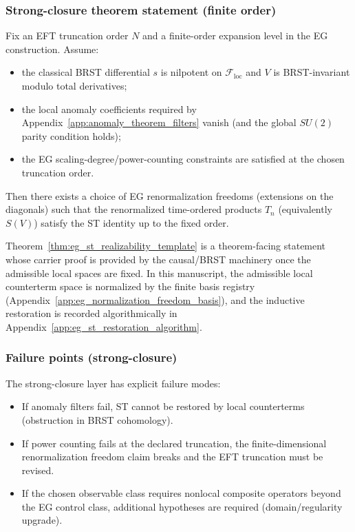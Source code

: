 \subsubsection{Strong-closure theorem statement (finite order)}
\begin{theorem}
\label{thm:eg_st_realizability_template}
Fix an EFT truncation order $N$ and a finite-order expansion level in the EG construction.
Assume:
\begin{itemize}
\item the classical BRST differential $s$ is nilpotent on $\mathcal{F}_{\mathrm{loc}}$ and $V$ is BRST-invariant modulo total derivatives;
\item the local anomaly coefficients required by Appendix~\ref{app:anomaly_theorem_filters} vanish (and the global $SU(2)$ parity condition holds);
\item the EG scaling-degree/power-counting constraints are satisfied at the chosen truncation order.
\end{itemize}
Then there exists a choice of EG renormalization freedoms (extensions on the diagonals) such that the renormalized time-ordered products $T_n$ (equivalently $S(V)$) satisfy the ST identity up to the fixed order.
\end{theorem}

\AuditTag Theorem~\ref{thm:eg_st_realizability_template} is a theorem-facing statement whose carrier proof is provided by the causal/BRST machinery once the admissible local spaces are fixed.
In this manuscript, the admissible local counterterm space is normalized by the finite basis registry (Appendix~\ref{app:eg_normalization_freedom_basis}), and the inductive restoration is recorded algorithmically in Appendix~\ref{app:eg_st_restoration_algorithm}.

\subsubsection{Failure points (strong-closure)}
\AuditTag The strong-closure layer has explicit failure modes:
\begin{itemize}
\item If anomaly filters fail, ST cannot be restored by local counterterms (obstruction in BRST cohomology).
\item If power counting fails at the declared truncation, the finite-dimensional renormalization freedom claim breaks and the EFT truncation must be revised.
\item If the chosen observable class requires nonlocal composite operators beyond the EG control class, additional hypotheses are required (domain/regularity upgrade).
\end{itemize}

